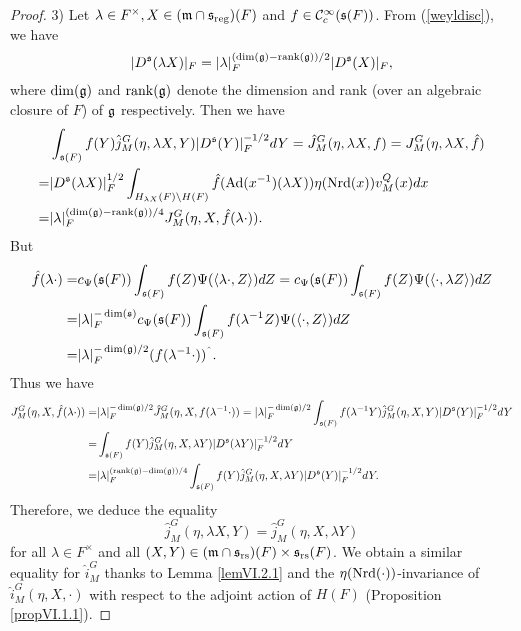 \documentclass[a4paper]{amsart}
\newcommand{\fm}{{\mathfrak{m}}} \newcommand{\fn}{{\mathfrak{n}}}\newcommand{\fo}{{\mathfrak{o}}} \newcommand{\fp}{{\mathfrak{p}}}
\newcommand{\rank}{{\mathrm{rank}}}                  \newcommand{\ra}{\rightarrow}    \newcommand{\Ra}{\Rightarrow}
\theoremstyle{definition}
\theoremstyle{remark}
\numberwithin{equation}{subsection}
\begin{document}
\begin{proof}
3) Let $\lambda\in F^\times, X\in(\fm\cap\fs_\reg)(F)$ and $f\in{\mathcal {C}}_c^\infty({\mathfrak{s}}(F))$. From (\ref{weyldisc}), we have
$$ |D^\fs(\lambda X)|_F=|\lambda|_F^{(\dim(\fg)-\rank(\fg))/2}|D^\fs(X)|_F, $$
where $\dim({\mathfrak{g}})$ and $\rank(\fg)$ denote the dimension and rank (over an algebraic closure of $F$) of ${\mathfrak{g}}$ respectively. Then we have
\[\begin{split}
&\int_{\fs(F)} f(Y) \hat{j}_M^G(\eta, \lambda X, Y) |D^\fs(Y)|_F^{-1/2} dY=\hat{J}_M^G(\eta, \lambda X, f)=J_M^G(\eta, \lambda X, \hat{f}) \\ 
=&|D^\fs(\lambda X)|_F^{1/2} \int_{H_{\lambda X}(F)\bs H(F)} \hat{f}(\Ad(x^{-1})(\lambda X)) \eta(\Nrd(x)) v_M^Q(x) dx \\
=&|\lambda|_F^{(\dim(\fg)-\rank(\fg))/4} J_M^G(\eta, X, \hat{f}(\lambda\cdot)). 
\end{split}\]
But
\[\begin{split}
 \hat{f}(\lambda\cdot)=&c_\Psi(\fs(F)) \int_{\fs(F)} f(Z) \Psi(\langle \lambda\cdot,Z \rangle) dZ=c_\Psi(\fs(F)) \int_{\fs(F)} f(Z) \Psi(\langle \cdot, \lambda Z \rangle) dZ \\
=&|\lambda|_F^{-\dim(\fs)}c_\Psi(\fs(F)) \int_{\fs(F)} f(\lambda^{-1}Z) \Psi(\langle \cdot, Z \rangle) dZ \\
=&|\lambda|_F^{-\dim(\fg)/2}(f(\lambda^{-1}\cdot))^\string^. 
\end{split}\]
Thus we have
\[\begin{split}
J_M^G(\eta, X, \hat{f}(\lambda\cdot))=&|\lambda|_F^{-\dim(\fg)/2}\hat{J}_M^G(\eta, X, f(\lambda^{-1}\cdot))=|\lambda|_F^{-\dim(\fg)/2}\int_{\fs(F)} f(\lambda^{-1}Y) \hat{j}_M^G(\eta, X, Y) |D^\fs(Y)|_F^{-1/2} dY \\
=&\int_{\fs(F)} f(Y) \hat{j}_M^G(\eta, X, \lambda Y) |D^\fs(\lambda Y)|_F^{-1/2} dY \\
=&|\lambda|_F^{(\rank(\fg)-\dim(\fg))/4} \int_{\fs(F)} f(Y) \hat{j}_M^G(\eta, X, \lambda Y) |D^\fs(Y)|_F^{-1/2} dY. 
\end{split}\]
Therefore, we deduce the equality
$$ \hat{j}_M^G(\eta, \lambda X, Y)=\hat{j}_M^G(\eta, X, \lambda Y) $$
for all $\lambda\in F^\times$ and all $(X, Y)\in(\fm\cap\fs_\rs)(F)\times\fs_\rs(F)$. We obtain a similar equality for $\hat{i}_M^G$ thanks to Lemma \ref{lemVI.2.1} and the $\eta({\mathrm{Nrd}}(\cdot))$-invariance of $\hat{i}_M^G(\eta, X, \cdot)$ with respect to the adjoint action of $H(F)$ (Proposition \ref{propVI.1.1}). 


\end{proof}
\end{document}
